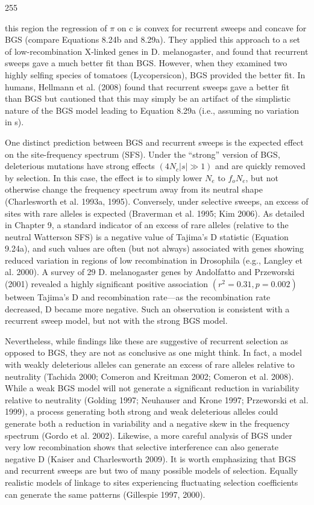 \documentclass{article}
\begin{document}
255

this region the regression of  $ \pi $ on c is convex for recurrent sweeps and concave for BGS (compare Equations 8.24b and 8.29a). They applied this approach to a set of low-recombination X-linked genes in D. melanogaster, and found that recurrent sweeps gave a much better fit than BGS. However, when they examined two highly selfing species of tomatoes (Lycopersicon), BGS provided the better fit. In humans, Hellmann et al. (2008) found that recurrent sweeps gave a better fit than BGS but cautioned that this may simply be an artifact of the simplistic nature of the BGS model leading to Equation 8.29a (i.e., assuming no variation in s).

One distinct prediction between BGS and recurrent sweeps is the expected effect on the site-frequency spectrum (SFS). Under the “strong” version of BGS, deleterious mutations have strong effects  $ (4N_c|s| \gg 1) $ and are quickly removed by selection. In this case, the effect is to simply lower  $ N_e $ to  $ f_o N_e $, but not otherwise change the frequency spectrum away from its neutral shape (Charlesworth et al. 1993a, 1995). Conversely, under selective sweeps, an excess of sites with rare alleles is expected (Braverman et al. 1995; Kim 2006). As detailed in Chapter 9, a standard indicator of an excess of rare alleles (relative to the neutral Watterson SFS) is a negative value of Tajima’s D statistic (Equation 9.24a), and such values are often (but not always) associated with genes showing reduced variation in regions of low recombination in Drosophila (e.g., Langley et al. 2000). A survey of 29 D. melanogaster genes by Andolfatto and Przeworski (2001) revealed a highly significant positive association  $ (r^2 = 0.31, p = 0.002) $ between Tajima’s D and recombination rate—as the recombination rate decreased, D became more negative. Such an observation is consistent with a recurrent sweep model, but not with the strong BGS model.

Nevertheless, while findings like these are suggestive of recurrent selection as opposed to BGS, they are not as conclusive as one might think. In fact, a model with weakly deleterious alleles can generate an excess of rare alleles relative to neutrality (Tachida 2000; Comeron and Kreitman 2002; Comeron et al. 2008). While a weak BGS model will not generate a significant reduction in variability relative to neutrality (Golding 1997; Neuhauser and Krone 1997; Przeworski et al. 1999), a process generating both strong and weak deleterious alleles could generate both a reduction in variability and a negative skew in the frequency spectrum (Gordo et al. 2002). Likewise, a more careful analysis of BGS under very low recombination shows that selective interference can also generate negative D (Kaiser and Charlesworth 2009). It is worth emphasizing that BGS and recurrent sweeps are but two of many possible models of selection. Equally realistic models of linkage to sites experiencing fluctuating selection coefficients can generate the same patterns (Gillespie 1997, 2000).
\end{document}
